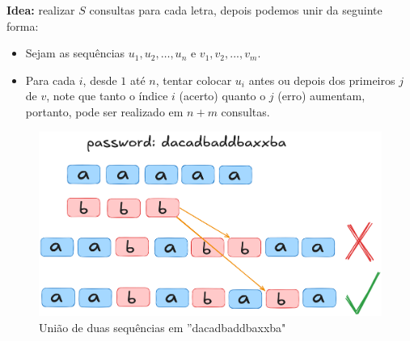 \documentclass[12pt]{beamer}
\begin{document}
\begin{frame}
\begin{bloco}

\textbf{Idea:} realizar $S$ consultas para cada letra, depois podemos unir da seguinte forma:

\begin{itemize}
    \item Sejam as sequências $u_1, u_2, \dots, u_n$ e $v_1, v_2, ..., v_m$.
    \item Para cada $i$, desde $1$ até $n$, tentar colocar $u_i$ antes ou depois dos primeiros $j$ de $v$, note
    que tanto o índice $i$ (acerto) quanto o $j$ (erro) aumentam, portanto, pode ser realizado em $n + m$ consultas.
\end{itemize}

\end{bloco}
\end{frame}

\begin{frame}
\begin{bloco}

\begin{figure}
    \centering
    \includegraphics[width=0.8\linewidth]{img/select.png}
    \caption{União de duas sequências em ''dacadbaddbaxxba"}
    \label{fig:enter-label}
\end{figure}

\end{bloco}
\end{frame}
\end{document}
